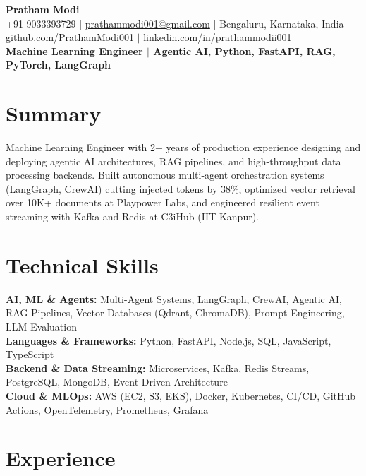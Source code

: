 \documentclass[10pt]{article}
\begin{document}
\begin{center}
{\Huge \textbf{Pratham Modi}} \\[2pt]
+91-9033393729 $\vert$ \href{mailto:prathammodi001@gmail.com}{prathammodi001@gmail.com} $\vert$ Bengaluru, Karnataka, India \\[1pt]
\href{https://github.com/PrathamModi001}{github.com/PrathamModi001} $\vert$ \href{https://www.linkedin.com/in/prathammodii001/}{linkedin.com/in/prathammodii001} \\[2pt]
\textbf{Machine Learning Engineer $\vert$ Agentic AI, Python, FastAPI, RAG, PyTorch, LangGraph}

\end{center}

\vspace{-6pt}
\section{Summary}
Machine Learning Engineer with 2+ years of production experience designing and deploying agentic AI architectures, RAG pipelines, and high-throughput data processing backends. Built autonomous multi-agent orchestration systems (LangGraph, CrewAI) cutting injected tokens by 38\%, optimized vector retrieval over 10K+ documents at Playpower Labs, and engineered resilient event streaming with Kafka and Redis at C3iHub (IIT Kanpur).

\section{Technical Skills}
\textbf{AI, ML \& Agents:} Multi-Agent Systems, LangGraph, CrewAI, Agentic AI, RAG Pipelines, Vector Databases (Qdrant, ChromaDB), Prompt Engineering, LLM Evaluation \\
\textbf{Languages \& Frameworks:} Python, FastAPI, Node.js, SQL, JavaScript, TypeScript \\
\textbf{Backend \& Data Streaming:} Microservices, Kafka, Redis Streams, PostgreSQL, MongoDB, Event-Driven Architecture \\
\textbf{Cloud \& MLOps:} AWS (EC2, S3, EKS), Docker, Kubernetes, CI/CD, GitHub Actions, OpenTelemetry, Prometheus, Grafana \\

\section{Experience}
\end{document}
